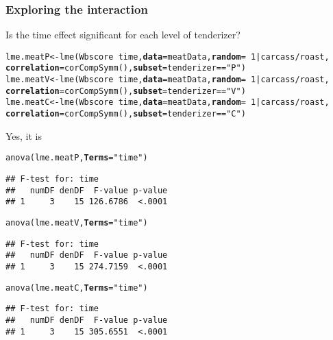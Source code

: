\documentclass[color=usenames,dvipsnames]{beamer}\usepackage[]{graphicx}\usepackage[]{color}
\makeatletter
\newcommand{\hlnum}[1]{\textcolor[rgb]{0.69,0.494,0}{#1}}%
\newcommand{\hlstr}[1]{\textcolor[rgb]{0.749,0.012,0.012}{#1}}%
\newcommand{\hlopt}[1]{\textcolor[rgb]{0,0,0}{#1}}%
\newcommand{\hlstd}[1]{\textcolor[rgb]{0,0,0}{#1}}%
\newcommand{\hlkwb}[1]{\textcolor[rgb]{0,0.341,0.682}{#1}}%
\newcommand{\hlkwc}[1]{\textcolor[rgb]{0,0,0}{\textbf{#1}}}%
\newcommand{\hlkwd}[1]{\textcolor[rgb]{0.004,0.004,0.506}{#1}}%
\newenvironment{kframe}{%
 \def\at@end@of@kframe{}%
 \ifinner\ifhmode%
  \def\at@end@of@kframe{\end{minipage}}%
  \begin{minipage}{\columnwidth}%
 \fi\fi%
 \def\FrameCommand##1{\hskip\@totalleftmargin \hskip-\fboxsep
 \colorbox{shadecolor}{##1}\hskip-\fboxsep
     \hskip-\linewidth \hskip-\@totalleftmargin \hskip\columnwidth}%
 \MakeFramed {\advance\hsize-\width
   \@totalleftmargin\z@ \linewidth\hsize
   \@setminipage}}%
 {\par\unskip\endMakeFramed%
 \at@end@of@kframe}
\newenvironment{knitrout}{}{} %
\makeatother
\begin{document}
\begin{frame}[fragile]
  \frametitle{Exploring the interaction}
  \small
  Is the time effect significant for each level of tenderizer?
\begin{knitrout}\tiny
{}\color{fgcolor}\begin{kframe}
\begin{alltt}
\hlstd{lme.meatP} \hlkwb{<-} \hlkwd{lme}\hlstd{(Wbscore} \hlopt{~} \hlstd{time,} \hlkwc{data}\hlstd{=meatData,} \hlkwc{random} \hlstd{=} \hlopt{~}\hlnum{1}\hlopt{|}\hlstd{carcass}\hlopt{/}\hlstd{roast,}
                 \hlkwc{correlation}\hlstd{=}\hlkwd{corCompSymm}\hlstd{(),} \hlkwc{subset}\hlstd{=tenderizer}\hlopt{==}\hlstr{"P"}\hlstd{)}
\hlstd{lme.meatV} \hlkwb{<-} \hlkwd{lme}\hlstd{(Wbscore} \hlopt{~} \hlstd{time,} \hlkwc{data}\hlstd{=meatData,} \hlkwc{random} \hlstd{=} \hlopt{~}\hlnum{1}\hlopt{|}\hlstd{carcass}\hlopt{/}\hlstd{roast,}
                 \hlkwc{correlation}\hlstd{=}\hlkwd{corCompSymm}\hlstd{(),} \hlkwc{subset}\hlstd{=tenderizer}\hlopt{==}\hlstr{"V"}\hlstd{)}
\hlstd{lme.meatC} \hlkwb{<-} \hlkwd{lme}\hlstd{(Wbscore} \hlopt{~} \hlstd{time,} \hlkwc{data}\hlstd{=meatData,} \hlkwc{random} \hlstd{=} \hlopt{~}\hlnum{1}\hlopt{|}\hlstd{carcass}\hlopt{/}\hlstd{roast,}
                 \hlkwc{correlation}\hlstd{=}\hlkwd{corCompSymm}\hlstd{(),} \hlkwc{subset}\hlstd{=tenderizer}\hlopt{==}\hlstr{"C"}\hlstd{)}
\end{alltt}
\end{kframe}
\end{knitrout}
\pause
\vfill
\small %
Yes, it is
\begin{knitrout}\tiny
{}\color{fgcolor}\begin{kframe}
\begin{alltt}
\hlkwd{anova}\hlstd{(lme.meatP,} \hlkwc{Terms}\hlstd{=}\hlstr{"time"}\hlstd{)}
\end{alltt}
\begin{verbatim}
## F-test for: time 
##   numDF denDF  F-value p-value
## 1     3    15 126.6786  <.0001
\end{verbatim}
\begin{alltt}
\hlkwd{anova}\hlstd{(lme.meatV,} \hlkwc{Terms}\hlstd{=}\hlstr{"time"}\hlstd{)}
\end{alltt}
\begin{verbatim}
## F-test for: time 
##   numDF denDF  F-value p-value
## 1     3    15 274.7159  <.0001
\end{verbatim}
\begin{alltt}
\hlkwd{anova}\hlstd{(lme.meatC,} \hlkwc{Terms}\hlstd{=}\hlstr{"time"}\hlstd{)}
\end{alltt}
\begin{verbatim}
## F-test for: time 
##   numDF denDF  F-value p-value
## 1     3    15 305.6551  <.0001
\end{verbatim}
\end{kframe}
\end{knitrout}

\end{frame}
\end{document}

